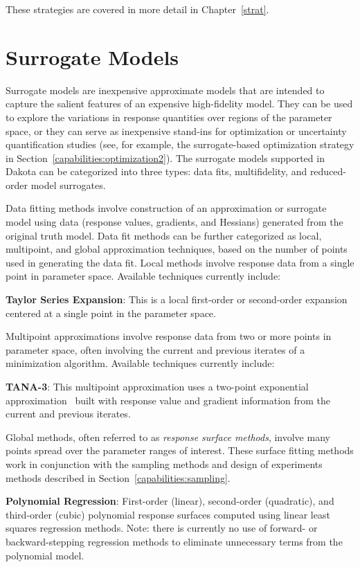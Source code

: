 These strategies are covered in more detail in Chapter~\ref{strat}.

\section{Surrogate Models}\label{capabilities:surrogate}

Surrogate models are inexpensive approximate models that are intended
to capture the salient features of an expensive high-fidelity model.
They can be used to explore the variations in response quantities over
regions of the parameter space, or they can serve as inexpensive
stand-ins for optimization or uncertainty quantification studies (see,
for example, the surrogate-based optimization strategy in
Section~\ref{capabilities:optimization2}).  The surrogate models
supported in Dakota can be categorized into three types: data fits,
multifidelity, and reduced-order model surrogates.

Data fitting methods involve construction of an approximation or
surrogate model using data (response values, gradients, and Hessians)
generated from the original truth model.  Data fit methods can be
further categorized as local, multipoint, and global approximation
techniques, based on the number of points used in generating the data
fit.  Local methods involve response data from a single point in
parameter space.  Available techniques currently include:

\textbf{Taylor Series Expansion}: This is a local first-order or
second-order expansion centered at a single point in the parameter space.

Multipoint approximations involve response data from two or more
points in parameter space, often involving the current and previous
iterates of a minimization algorithm.  Available techniques currently
include:

\textbf{TANA-3}: This multipoint approximation uses a two-point
exponential approximation~\cite{Xu98,Fad90} built with response value
and gradient information from the current and previous iterates.

Global methods, often referred to as \emph{response surface methods},
involve many points spread over the parameter ranges of interest.
These surface fitting methods work in conjunction with the sampling
methods and design of experiments methods described in
Section~\ref{capabilities:sampling}.

\textbf{Polynomial Regression}: First-order (linear), second-order
(quadratic), and third-order (cubic) polynomial response surfaces
computed using linear least squares regression methods. Note: there is
currently no use of forward- or backward-stepping regression methods
to eliminate unnecessary terms from the polynomial model.

